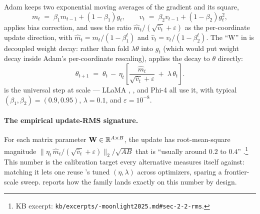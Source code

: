 Adam \citep[Kingma \&
Ba 2015]{muon-moonlight2025} keeps two exponential moving averages of the
gradient and its square,
\begin{equation}
m_t \;=\; \beta_1 m_{t-1} + (1 - \beta_1) g_t, \qquad
v_t \;=\; \beta_2 v_{t-1} + (1 - \beta_2) g_t^2,
\label{eq:adam-moments}
\end{equation}
applies bias correction, and uses the ratio
$\hat{m}_t / (\sqrt{\hat{v}_t} + \varepsilon)$ as the per-coordinate
update direction, with $\hat{m}_t = m_t / (1 - \beta_1^t)$ and
$\hat{v}_t = v_t / (1 - \beta_2^t)$. The ``W'' in 
\citep[Loshchilov \&
Hutter 2019]{muon-moonlight2025} is decoupled weight
decay: rather than fold $\lambda \theta$ into $g_t$ (which would put
weight decay inside Adam's per-coordinate rescaling),  applies
the decay to $\theta$ directly:
\begin{equation}
\theta_{t+1} \;=\; \theta_t \,-\, \eta_t \!\left[
   \frac{\hat{m}_t}{\sqrt{\hat{v}_t} + \varepsilon} \;+\; \lambda\,\theta_t
\right].
\label{eq:adamw}
\tag{2}
\end{equation}
 is the universal  step at  scale --- LLaMA
\citep{meta-llama3},  \citep[\S 4]{deepseek-v3}, and Phi-4
\citep{phi4} all use it, with typical
$(\beta_1, \beta_2) = (0.9, 0.95)$, $\lambda = 0.1$, and $\varepsilon
= 10^{-8}$.

\paragraph{The empirical update-RMS signature.}
For each matrix parameter $\mathbf{W} \in \mathbb{R}^{A \times B}$, the 
update has root-mean-square magnitude
$\| \eta_t \, \hat{m}_t / (\sqrt{\hat{v}_t} + \varepsilon) \|_2 /
\sqrt{AB}$ that is ``usually around $0.2$ to $0.4$'' \citep[\S
2.2]{muon-moonlight2025}.\footnote{KB excerpt:
\texttt{kb/excerpts/-moonlight2025.md\#sec-2-2-rms}.} This number
is the calibration target every alternative measures itself against:
matching it lets one reuse 's tuned $(\eta, \lambda)$ across
optimizers, sparing a frontier-scale sweep. 
reports how the  family lands exactly on this number by design.

